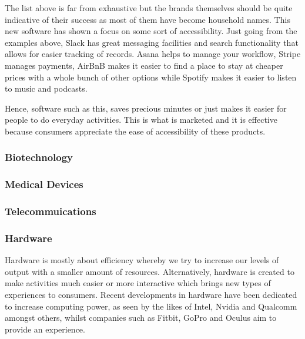 \documentclass[a4paper]{article}
\begin{document}
{\vspace{5pt}
\noindent The list above is far from exhaustive but the brands themselves should be quite indicative of their success as most of them have become household names. This new software has shown a focus on some sort of accessibility. Just going from the examples above, Slack has great messaging facilities and search functionality that allows for easier tracking of records. Asana helps to manage your workflow, Stripe manages payments, AirBnB makes it easier to find a place to stay at cheaper prices with a whole bunch of other options while Spotify makes it easier to listen to music and podcasts.

\vspace{5pt}
\noindent Hence, software such as this, saves precious minutes or just makes it easier for people to do everyday activities. This is what is marketed and it is effective because consumers appreciate the ease of accessibility of these products.

\subsubsection{Biotechnology}

\subsubsection{Medical Devices}

\subsubsection{Telecommuications}


\subsubsection{Hardware}
Hardware is mostly about efficiency whereby we try to increase our levels of output with a smaller amount of resources. Alternatively, hardware is created to make activities much easier or more interactive which brings new types of experiences to consumers. Recent developments in hardware have been dedicated to increase computing power, as seen by the likes of Intel, Nvidia and Qualcomm amongst others, whilst companies such as Fitbit, GoPro and Oculus aim to provide an experience.

}
\end{document}
